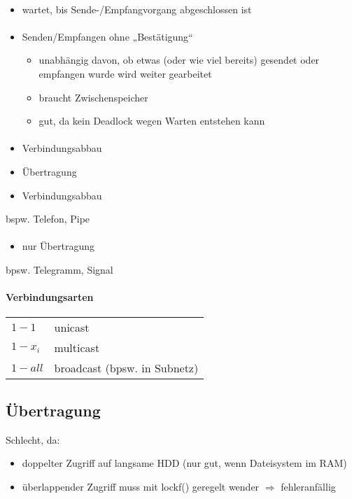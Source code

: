 \paragraph{}
\begin{itemize}
\item wartet, bis Sende-/Empfangvorgang abgeschlossen ist
\end{itemize}
\paragraph{}
\begin{itemize}
\item Senden/Empfangen ohne „Bestätigung“
\begin{itemize}[label=$\to$]
\item unabhängig davon, ob etwas (oder wie viel bereits) gesendet oder empfangen wurde wird weiter gearbeitet
\item braucht Zwischenspeicher
\item gut, da kein Deadlock wegen Warten entstehen kann
\end{itemize}
\end{itemize}
\paragraph{}
\begin{itemize}
\item Verbindungsabbau
\item Übertragung
\item Verbindungsabbau
\end{itemize}
bspw. Telefon, Pipe
\paragraph{}
\begin{itemize}
\item nur Übertragung
\end{itemize}
bpsw. Telegramm, Signal
\paragraph{Verbindungsarten}
\begin{tabular}{l l}
$1-1$ & unicast\\
$1-x_i$ & multicast\\
$1-all$ & broadcast (bpsw. in Subnetz)
\end{tabular}
\subsection[Übertragung über Datei]{Übertragung }
Schlecht, da:
\begin{itemize}
\item doppelter Zugriff auf langsame HDD (nur gut, wenn Dateisystem im RAM)
\item überlappender Zugriff muss mit lockf() geregelt wender $\Rightarrow$ fehleranfällig
\end{itemize}

